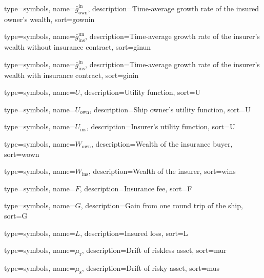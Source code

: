 {
  type={symbols}, 
  name={\ensuremath{\bar{g}_{\text{own}}^{\text{in}}}},
  description={Time-average growth rate of the insured owner's wealth},
  sort=gownin
}


{
  type={symbols}, 
  name={\ensuremath{\bar{g}_{\text{ins}}^{\text{un}}}},
  description={Time-average growth rate of the insurer's wealth without insurance contract},
  sort=ginun
}

{
  type={symbols}, 
  name={\ensuremath{\bar{g}_{\text{ins}}^{\text{in}}}},
  description={Time-average growth rate of the insurer's wealth with insurance contract},
  sort=ginin
}

{
  type={symbols}, 
  name={\ensuremath{U}},
  description={Utility function},
  sort=U
}

{
  type={symbols}, 
  name={\ensuremath{U_{\text{own}}}},
  description={Ship owner's utility function},
  sort=U
}

{
  type={symbols}, 
  name={\ensuremath{U_{\text{ins}}}},
  description={Insurer's utility function},
  sort=U
}

{
  type={symbols}, 
  name={\ensuremath{W_{\text{own}}}},
  description={Wealth of the insurance buyer},
  sort=wown
}

{
  type={symbols}, 
  name={\ensuremath{W_{\text{ins}}}},
  description={Wealth of the insurer},
  sort=wins
}


{
  type={symbols}, 
  name={\ensuremath{F}},
  description={Insurance fee},
  sort=F
}

{
  type={symbols}, 
  name={\ensuremath{G}},
  description={Gain from one round trip of the ship},
  sort=G
}

{
  type={symbols}, 
  name={\ensuremath{L}},
  description={Insured loss},
  sort=L
}


{
  type={symbols}, 
  name={\ensuremath{\mu_\text{r}}},
  description={Drift of riskless asset},
  sort=mur
}

{
  type={symbols}, 
  name={\ensuremath{\mu_\text{s}}},
  description={Drift of risky asset},
  sort=mus
}

